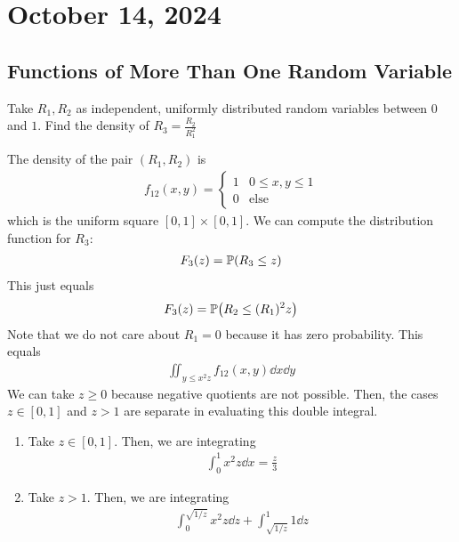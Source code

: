 \section{October 14, 2024}

\subsection{Functions of More Than One Random Variable}
\begin{example}
    Take $R_1,R_2$ as independent, uniformly distributed random variables between $0$ and $1$. Find the density of $R_3 = \frac{R_2}{R_1^2}$
\end{example}
\begin{solution}
    The density of the pair $(R_1,R_2)$ is
    \begin{align}
        f_{12}(x,y) = \begin{cases}
            1 & 0 \le x,y \le 1\\
            0 & \text{else}
        \end{cases}
    \end{align}
    which is the uniform square $[0,1] \times [0,1]$. We can compute the distribution function for $R_3$:
    \begin{align}
        F_3(z) = \mathbb{P}(R_3 \le z)
    \end{align}
    This just equals
    \begin{align}
        F_3(z) = \mathbb{P}\qty(R_2 \le (R_1)^2z)
    \end{align}
    Note that we do not care about $R_1 = 0$ because it has zero probability. This equals
    \begin{align}
        \iint_{y \le x^2 z} f_{12}(x,y) \dd{x}\dd{y}
    \end{align}
    We can take $z \ge 0$ because negative quotients are not possible. Then, the cases $z \in [0,1]$ and $z > 1$ are separate in evaluating this double integral.
    \begin{enumerate}
        \item Take $z \in [0,1]$. Then, we are integrating
        \begin{align}
            \int_0^1 x^2 z \dd{x} = \frac{z}{3}
        \end{align}
        \item Take $z > 1$. Then, we are integrating
        \begin{align}
            \int_0^{\sqrt{1/z}} x^2 z \dd{z} + \int_{\sqrt{1/z}}^1 1 \dd{z}
        \end{align}

\end{enumerate}
\end{solution}
